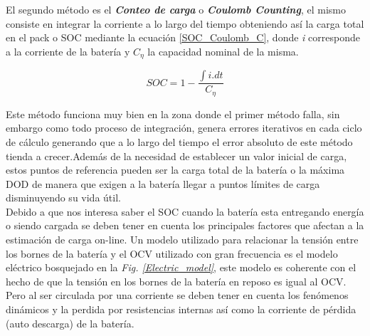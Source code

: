 \documentclass[10pt,a4paper]{article}
\begin{document}
El segundo método es el \textbf{\emph{Conteo de carga}} o \textbf{\emph{Coulomb Counting}}, el mismo consiste en integrar la corriente a lo largo del tiempo obteniendo así la carga total en el pack o SOC mediante la ecuación \ref{SOC_Coulomb_C}, donde \emph{i} corresponde a la corriente de la batería y $C_\eta$ la capacidad nominal de la misma.\\

\begin{figure}[h!]
	\begin{center}
		\begin{equation}
			SOC=1-\frac{\int{i.dt}}{C_\eta}\label{SOC_Coulomb_C}
		\end{equation}	
	\end{center}
\end{figure}

 Este método funciona muy bien en la zona donde el primer método falla, sin embargo como todo proceso de integración, genera errores iterativos en cada ciclo de cálculo generando que a lo largo del tiempo el error absoluto de este método tienda a crecer.Además de la necesidad de establecer un valor inicial de carga, estos puntos de referencia pueden ser la carga total de la batería o la máxima DOD de manera que exigen a la batería llegar a puntos límites de carga disminuyendo su vida útil.\\

Debido a que nos interesa saber el SOC cuando la batería esta entregando energía o siendo cargada se deben tener en cuenta los principales factores que afectan a la estimación de carga on-line. Un modelo utilizado para relacionar la tensión entre los bornes de la batería y el OCV utilizado con gran frecuencia es el modelo eléctrico bosquejado en la \emph{Fig. \ref{Electric_model}}, este modelo es coherente con el hecho de que la tensión en los bornes de la batería en reposo es igual al OCV. Pero al ser circulada por una corriente se deben tener en cuenta los fenómenos dinámicos  y la perdida por resistencias internas así como la corriente de pérdida (auto descarga) de la batería.
  
\end{document}

